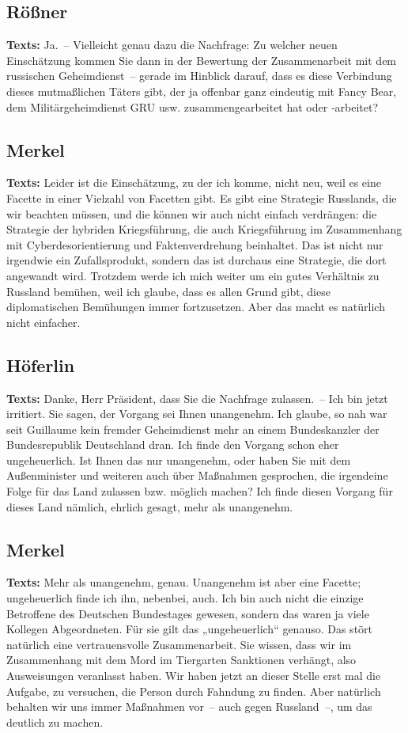 \documentclass{article}
\begin{document}
\subsection{Rößner}
\noindent\textbf{Texts:} Ja. – Vielleicht genau dazu die Nachfrage: Zu welcher neuen Einschätzung kommen Sie dann in der Bewertung der Zusammenarbeit mit dem russischen Geheimdienst – gerade im Hinblick darauf, dass es diese Verbindung dieses mutmaßlichen Täters gibt, der ja offenbar ganz eindeutig mit Fancy Bear, dem Militärgeheimdienst GRU usw. zusammengearbeitet hat oder ‑arbeitet?

\subsection{Merkel}
\noindent\textbf{Texts:} Leider ist die Einschätzung, zu der ich komme, nicht neu, weil es eine Facette in einer Vielzahl von Facetten gibt. Es gibt eine Strategie Russlands, die wir beachten müssen, und die können wir auch nicht einfach verdrängen: die Strategie der hybriden Kriegsführung, die auch Kriegsführung im Zusammenhang mit Cyberdesorientierung und Faktenverdrehung beinhaltet. Das ist nicht nur irgendwie ein Zufallsprodukt, sondern das ist durchaus eine Strategie, die dort angewandt wird. Trotzdem werde ich mich weiter um ein gutes Verhältnis zu Russland bemühen, weil ich glaube, dass es allen Grund gibt, diese diplomatischen Bemühungen immer fortzusetzen. Aber das macht es natürlich nicht einfacher.

\subsection{Höferlin}
\noindent\textbf{Texts:} Danke, Herr Präsident, dass Sie die Nachfrage zulassen. – Ich bin jetzt irritiert. Sie sagen, der Vorgang sei Ihnen unangenehm. Ich glaube, so nah war seit Guillaume kein fremder Geheimdienst mehr an einem Bundeskanzler der Bundesrepublik Deutschland dran. Ich finde den Vorgang schon eher ungeheuerlich. Ist Ihnen das nur unangenehm, oder haben Sie mit dem Außenminister und weiteren auch über Maßnahmen gesprochen, die irgendeine Folge für das Land zulassen bzw. möglich machen? Ich finde diesen Vorgang für dieses Land nämlich, ehrlich gesagt, mehr als unangenehm.

\subsection{Merkel}
\noindent\textbf{Texts:} Mehr als unangenehm, genau. Unangenehm ist aber eine Facette; ungeheuerlich finde ich ihn, nebenbei, auch. Ich bin auch nicht die einzige Betroffene des Deutschen Bundestages gewesen, sondern das waren ja viele Kollegen Abgeordneten. Für sie gilt das „ungeheuerlich“ genauso. Das stört natürlich eine vertrauensvolle Zusammenarbeit. Sie wissen, dass wir im Zusammenhang mit dem Mord im Tiergarten Sanktionen verhängt, also Ausweisungen veranlasst haben. Wir haben jetzt an dieser Stelle erst mal die Aufgabe, zu versuchen, die Person durch Fahndung zu finden. Aber natürlich behalten wir uns immer Maßnahmen vor – auch gegen Russland –, um das deutlich zu machen.
\end{document}

